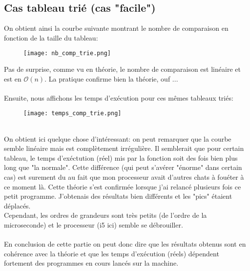 \documentclass[a4paper,12pt]{article}
\begin{document}
\subsection{Cas tableau trié (cas "facile")}
On obtient ainsi la courbe suivante montrant le nombre de comparaison en fonction de la taille du tableau:
\begin{figure}[!h]
  \centering
  \texttt{[image: nb\_comp\_trie.png]}
\end{figure}
\newpage
Pas de surprise, comme vu en théorie, le nombre de comparaison est linéaire et est en $\mathcal{O}(n)$. La pratique confirme bien la théorie, ouf ... \\ \\
Ensuite, nous affichons les temps d'exécution pour ces mêmes tableaux triés:
\begin{figure}[!h]
  \centering
  \texttt{[image: temps\_comp\_trie.png]}
\end{figure} \\
On obtient ici quelque chose d'intéressant: on peut remarquer que la courbe semble linéaire mais est complètement irrégulière. Il semblerait que pour certain tableau, le temps d'exéctution (réel) mis par la fonction soit des fois bien plus long que "la normale". Cette différence (qui peut s'avérer "énorme" dans certain cas) est surement du au fait que mon processeur avait d'autres chats à fouéter à ce moment là. Cette théorie s'est confirmée lorsque j'ai relancé plusieurs fois ce petit programme. J'obtenais des résultats bien différents et les "pics" étaient déplacés.\\
Cependant, les ordres de grandeurs sont très petits (de l'ordre de la microseconde) et le processeur (i5 ici) semble se débrouiller. \\ \\
En conclusion de cette partie on peut donc dire que les résultats obtenus sont en cohérence avec la théorie et que les temps d'exécution (réels) dépendent fortement des programmes en cours lancés sur la machine. 
\end{document}

